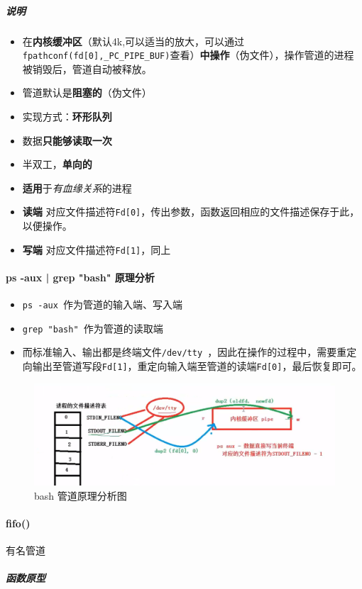 \documentclass[UTF8,a4paper,12pt]{ctexbook}
\begin{document}
			\subparagraph{说明}
				\begin{itemize}[itemindent = 1em]
					\item 在\textbf{内核缓冲区}（默认4k,可以适当的放大，可以通过\verb|fpathconf(fd[0],_PC_PIPE_BUF)|查看）\textbf{中操作}（伪文件），操作管道的进程被销毁后，管道自动被释放。
					\item 管道默认是\textbf{阻塞的}（伪文件）	
					\item 实现方式：\textbf{环形队列}	
					\item 数据\textbf{只能够读取一次}
					\item 半双工，\textbf{单向的}
					\item \textbf{适用}于\textit{有血缘关系}的进程			
					\item \textbf{读端 }对应文件描述符\verb|Fd[0]|，传出参数，函数返回相应的文件描述保存于此，以便操作。
					\item \textbf{写端 }对应文件描述符\verb|Fd[1]|，同上
				\end{itemize}
				
		\paragraph{ps -aux | grep "bash" 原理分析}
			\begin{itemize}[itemindent = 1em]
				\item \verb|ps -aux |作为管道的输入端、写入端
				\item \verb|grep "bash" |作为管道的读取端
				\item 而标准输入、输出都是终端文件\verb|/dev/tty |，因此在操作的过程中，需要重定向输出至管道写段\verb|Fd[1]|，重定向输入端至管道的读端\verb|Fd[0]|，最后恢复即可。
			\end{itemize}
			
			\begin{figure}[H]
				\centering
				\includegraphics[scale=0.35]{psPipe.png}
				\caption{bash 管道原理分析图}
			\end{figure}
				
		\paragraph{fifo()}有名管道
			\subparagraph{函数原型}
			
\end{document}
